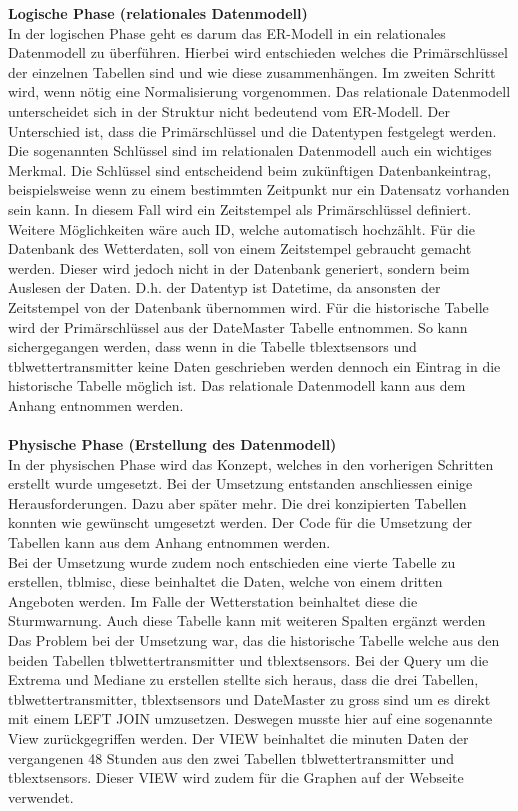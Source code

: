 \textbf{Logische Phase (relationales Datenmodell)}\\

In der logischen Phase geht es darum das ER-Modell in ein relationales Datenmodell zu überführen. Hierbei wird entschieden welches die Primärschlüssel der einzelnen Tabellen sind und wie diese zusammenhängen. Im zweiten Schritt wird, wenn nötig eine Normalisierung vorgenommen. Das relationale Datenmodell unterscheidet sich in der Struktur nicht bedeutend vom ER-Modell. Der Unterschied  ist, dass die Primärschlüssel und die Datentypen festgelegt werden. Die sogenannten Schlüssel sind im relationalen Datenmodell auch ein wichtiges Merkmal. Die Schlüssel sind entscheidend beim zukünftigen Datenbankeintrag, beispielsweise wenn zu einem bestimmten Zeitpunkt nur ein Datensatz vorhanden sein kann. In diesem Fall wird ein Zeitstempel als Primärschlüssel definiert. Weitere Möglichkeiten wäre auch ID, welche automatisch hochzählt. Für die Datenbank des Wetterdaten, soll von einem Zeitstempel gebraucht gemacht werden. Dieser wird jedoch nicht in der Datenbank generiert, sondern beim Auslesen der Daten. D.h. der Datentyp ist Datetime, da ansonsten der Zeitstempel von der Datenbank übernommen wird. Für die historische Tabelle wird der Primärschlüssel aus der DateMaster Tabelle entnommen. So kann sichergegangen werden, dass wenn in die Tabelle tblextsensors und tblwettertransmitter keine Daten geschrieben werden dennoch ein Eintrag in die historische Tabelle möglich ist. Das relationale Datenmodell kann aus dem Anhang  entnommen werden.\\ \\


\textbf{Physische Phase (Erstellung des Datenmodell)}\\

In der physischen Phase wird das Konzept, welches in den vorherigen Schritten erstellt wurde umgesetzt. Bei der Umsetzung entstanden anschliessen einige Herausforderungen. Dazu aber später mehr. Die drei konzipierten Tabellen konnten wie gewünscht umgesetzt werden. Der Code für die Umsetzung der Tabellen kann aus dem Anhang entnommen werden.\\
Bei der Umsetzung wurde zudem noch entschieden eine vierte Tabelle zu erstellen, tblmisc, diese beinhaltet die Daten, welche von einem dritten Angeboten werden. Im Falle der Wetterstation beinhaltet diese die Sturmwarnung. Auch diese Tabelle kann mit weiteren Spalten ergänzt werden
Das Problem bei der Umsetzung war, das die historische Tabelle welche aus den beiden Tabellen tblwettertransmitter und tblextsensors. Bei der Query um die Extrema und Mediane zu erstellen stellte sich heraus, dass die drei Tabellen, tblwettertransmitter, tblextsensors und DateMaster zu gross sind um es direkt mit einem LEFT JOIN umzusetzen. Deswegen musste hier auf eine sogenannte View zurückgegriffen werden. Der VIEW beinhaltet die minuten Daten der vergangenen 48 Stunden aus den zwei Tabellen tblwettertransmitter und tblextsensors. Dieser VIEW wird zudem für die Graphen auf der Webseite verwendet.

